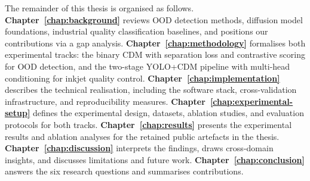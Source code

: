 The remainder of this thesis is organised as follows. \textbf{Chapter~\ref{chap:background}} reviews OOD detection methods, diffusion model foundations, industrial quality classification baselines, and positions our contributions via a gap analysis. \textbf{Chapter~\ref{chap:methodology}} formalises both experimental tracks: the binary CDM with separation loss and contrastive scoring for OOD detection, and the two-stage YOLO+CDM pipeline with multi-head conditioning for inkjet quality control. \textbf{Chapter~\ref{chap:implementation}} describes the technical realisation, including the software stack, cross-validation infrastructure, and reproducibility measures. \textbf{Chapter~\ref{chap:experimental-setup}} defines the experimental design, datasets, ablation studies, and evaluation protocols for both tracks. \textbf{Chapter~\ref{chap:results}} presents the experimental results and ablation analyses for the retained public artefacts in the thesis. \textbf{Chapter~\ref{chap:discussion}} interprets the findings, draws cross-domain insights, and discusses limitations and future work. \textbf{Chapter~\ref{chap:conclusion}} answers the six research questions and summarises contributions.
\endgroup
